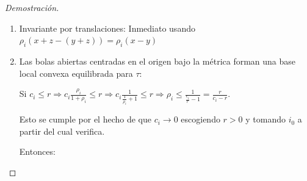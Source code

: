 \begin{proof}[Demostración]
\begin{enumerate}
\begin{enumerate}
			Verificando la primera propiedad: 
			
			\begin{equation*}
				d(x,x) = \sup_{i \in \mathbb{N}} \frac{c_i p_i(x-x)}{1+p_i(x-x)} = 0
			\end{equation*}	
			
			Por norma separando puntos $\exists i \in \mathbb{N}: p_i(x-z) \neq 0 $. De donde:
			
			\begin{align*}
				d(x,z) &= \sup_{i \in \mathbb{N}} \frac{c_i p_i(x-z)}{1+p_i(x-z)} \\
				&= \sup_{i \in \mathbb{N}} \frac{c_i }{\frac{1}{p_i(x-z)}+1} \\
				&\leq \sup_{i \in \mathbb{N}} \frac{c_i }{\frac{1}{p_i(x-y) + p_i(y-z)}+1}\\
				&= \sup_{i \in \mathbb{N}} \frac{c_i (p_i(x-y) + p_i(y-z))}{1+ p_i(x-y) + p_i(y-z)}\\
				&= \sup_{i \in \mathbb{N}} \frac{c_i p_i(x-y)}{1+ p_i(x-y) + p_i(y-z)} + \frac{c_i p_i(y-z)}{1+ p_i(x-y) + p_i(y-z)} \\
				&\leq \sup_{i \in \mathbb{N}} \frac{c_i p_i(x-y)}{1+ p_i(x-y)} + \sup_{i \in \mathbb{N}}  \frac{c_i p_i(y-z)}{1+ p_i(y-z)} \\
				&= d(x,y) + d(y,z) \\
			\end{align*}	
			
			La positividad es dada trivialmente de la positividad de las seminormas.
			
			\item Invariante por translaciones: Inmediato usando $\rho_i (x+ z - (y+z)) = \rho_i (x-y)$
			
			\item Las bolas abiertas centradas en el origen bajo la métrica forman una base local convexa equilibrada para $\tau$:
			
			Si $c_i \leq r \Rightarrow c_i \frac{\rho_i}{1+\rho_i} \leq  r\Rightarrow c_i \frac{1}{\frac{1}{\rho_i}+1}\leq  r\Rightarrow \rho_i\leq  \frac{1}{\frac{c_i}{r}-1} =\frac{r}{c_i - r}$.
			
			Esto se cumple por el hecho de que $c_i\to 0$ escogiendo $r>0$ y tomando $i_0$ a partir del cual verifica.
			
			Entonces:
			

\end{enumerate}
\end{enumerate}
\end{proof}
